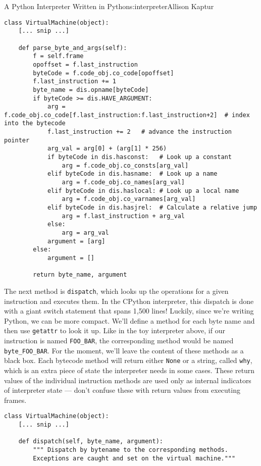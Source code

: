 \begin{aosachapter}{A Python Interpreter Written in Python}{s:interpreter}{Allison Kaptur}
\begin{verbatim}
class VirtualMachine(object):
    [... snip ...]

    def parse_byte_and_args(self):
        f = self.frame
        opoffset = f.last_instruction
        byteCode = f.code_obj.co_code[opoffset]
        f.last_instruction += 1
        byte_name = dis.opname[byteCode]
        if byteCode >= dis.HAVE_ARGUMENT:
            arg = f.code_obj.co_code[f.last_instruction:f.last_instruction+2]  # index into the bytecode
            f.last_instruction += 2   # advance the instruction pointer
            arg_val = arg[0] + (arg[1] * 256)
            if byteCode in dis.hasconst:   # Look up a constant
                arg = f.code_obj.co_consts[arg_val]
            elif byteCode in dis.hasname:  # Look up a name
                arg = f.code_obj.co_names[arg_val]
            elif byteCode in dis.haslocal: # Look up a local name
                arg = f.code_obj.co_varnames[arg_val]
            elif byteCode in dis.hasjrel:  # Calculate a relative jump
                arg = f.last_instruction + arg_val
            else:
                arg = arg_val
            argument = [arg]
        else:
            argument = []

        return byte_name, argument
\end{verbatim}

The next method is \texttt{dispatch}, which looks up the operations for
a given instruction and executes them. In the CPython interpreter, this
dispatch is done with a giant switch statement that spans 1,500 lines!
Luckily, since we're writing Python, we can be more compact. We'll
define a method for each byte name and then use \texttt{getattr} to look
it up. Like in the toy interpreter above, if our instruction is named
\texttt{FOO\_BAR}, the corresponding method would be named
\texttt{byte\_FOO\_BAR}. For the moment, we'll leave the content of
these methods as a black box. Each bytecode method will return either
\texttt{None} or a string, called \texttt{why}, which is an extra piece
of state the interpreter needs in some cases. These return values of the
individual instruction methods are used only as internal indicators of
interpreter state --- don't confuse these with return values from
executing frames.

\begin{verbatim}
class VirtualMachine(object):
    [... snip ...]

    def dispatch(self, byte_name, argument):
        """ Dispatch by bytename to the corresponding methods.
        Exceptions are caught and set on the virtual machine."""


\end{verbatim}
\end{aosachapter}
